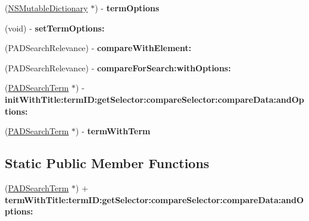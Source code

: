 \begin{DoxyCompactItemize}
\item 
\hypertarget{interface_p_a_d_search_term_ad030ec0feb751373f6ded66b5cca48a2}{
(\hyperlink{class_n_s_mutable_dictionary}{NSMutableDictionary} $\ast$) -\/ {\bfseries termOptions}}
\label{interface_p_a_d_search_term_ad030ec0feb751373f6ded66b5cca48a2}

\item 
\hypertarget{interface_p_a_d_search_term_a01af33205c85c2100a14db967f3b2394}{
(void) -\/ {\bfseries setTermOptions:}}
\label{interface_p_a_d_search_term_a01af33205c85c2100a14db967f3b2394}

\item 
\hypertarget{interface_p_a_d_search_term_af8a06a1a6bdea1d246bd87d57f163f70}{
(PADSearchRelevance) -\/ {\bfseries compareWithElement:}}
\label{interface_p_a_d_search_term_af8a06a1a6bdea1d246bd87d57f163f70}

\item 
\hypertarget{interface_p_a_d_search_term_a0561b75a15526e18467453071ecf0c75}{
(PADSearchRelevance) -\/ {\bfseries compareForSearch:withOptions:}}
\label{interface_p_a_d_search_term_a0561b75a15526e18467453071ecf0c75}

\item 
\hypertarget{interface_p_a_d_search_term_aca5bc436de772d6a45afedc6f91453e8}{
(\hyperlink{interface_p_a_d_search_term}{PADSearchTerm} $\ast$) -\/ {\bfseries initWithTitle:termID:getSelector:compareSelector:compareData:andOptions:}}
\label{interface_p_a_d_search_term_aca5bc436de772d6a45afedc6f91453e8}

\item 
\hypertarget{interface_p_a_d_search_term_aed1a947617614e992c83be5c19aeedf9}{
(\hyperlink{interface_p_a_d_search_term}{PADSearchTerm} $\ast$) -\/ {\bfseries termWithTerm}}
\label{interface_p_a_d_search_term_aed1a947617614e992c83be5c19aeedf9}

\end{DoxyCompactItemize}
\subsection*{Static Public Member Functions}
\begin{DoxyCompactItemize}
\item 
\hypertarget{interface_p_a_d_search_term_a4a08f67e5274d0cba20d65f673d4bd06}{
(\hyperlink{interface_p_a_d_search_term}{PADSearchTerm} $\ast$) + {\bfseries termWithTitle:termID:getSelector:compareSelector:compareData:andOptions:}}
\label{interface_p_a_d_search_term_a4a08f67e5274d0cba20d65f673d4bd06}

\end{DoxyCompactItemize}
